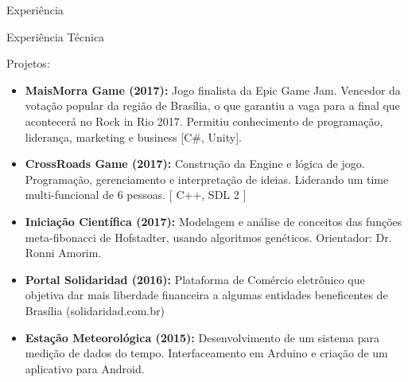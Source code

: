 \documentclass[]{fraguilarcv}
\begin{document}
\begin{cvsection}{Experiência}
	\begin{cvsection}{Experiência Técnica}
		\begin{cvsubsection}{Projetos:}{}{}
			\begin{itemize}
	    	\item \textbf{MaisMorra Game (2017):} Jogo finalista da Epic Game Jam. Vencedor da votação popular da região de Brasília, o que garantiu a vaga para a final que acontecerá no Rock in Rio 2017. Permitiu conhecimento de programação, liderança, marketing e business  [C\#, Unity].
			\item \textbf{CrossRoads Game (2017):} Construção da Engine e lógica de jogo. Programação, gerenciamento e interpretação de ideias. Liderando um time multi-funcional de 6 pessoas. [ C++, SDL 2 ]
			\item \textbf{Iniciação Científica (2017):} Modelagem e análise de conceitos das funções meta-fibonacci de Hofstadter, usando algoritmos genéticos. Orientador: Dr. Ronni Amorim.
	      	\item \textbf{Portal Solidaridad (2016):} Plataforma de Comércio eletrônico que objetiva dar mais liberdade financeira a algumas entidades beneficentes de Brasília (solidaridad.com.br)
            \item \textbf{Estação Meteorológica (2015):} Desenvolvimento de um sistema para medição de dados do tempo. Interfaceamento em Arduino e criação de um aplicativo para Android.
			\end{itemize}
		\end{cvsubsection}
	\end{cvsection}
\end{cvsection}
\end{document}
